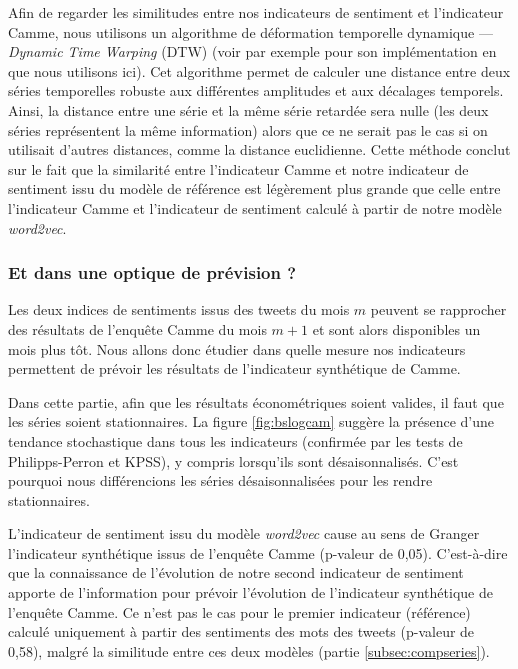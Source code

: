 \documentclass[11pt,french,french]{article}
\begin{document}
Afin de regarder les similitudes entre nos indicateurs de sentiment et l'indicateur Camme, nous utilisons un algorithme de déformation temporelle dynamique --- \emph{Dynamic Time Warping} (DTW) (voir par exemple \cite{dtw} pour son implémentation en \faRProject{} que nous utilisons ici).
Cet algorithme permet de calculer une distance entre deux séries temporelles robuste aux différentes amplitudes et aux décalages temporels.
Ainsi, la distance entre une série et la même série retardée sera nulle (les deux séries représentent la même information) alors que ce ne serait pas le cas si on utilisait d'autres distances, comme la distance euclidienne.
Cette méthode conclut sur le fait que la similarité entre l'indicateur Camme et notre indicateur de sentiment issu du modèle de référence est légèrement plus grande que celle entre l'indicateur Camme et l'indicateur de sentiment calculé à partir de notre modèle \emph{word2vec}.

\hypertarget{et-dans-une-optique-de-pruxe9vision}{%
\subsubsection{Et dans une optique de prévision ?}\label{et-dans-une-optique-de-pruxe9vision}}

Les deux indices de sentiments issus des tweets du mois \(m\) peuvent se rapprocher des résultats de l'enquête Camme du mois \(m+1\) et sont alors disponibles un mois plus tôt.
Nous allons donc étudier dans quelle mesure nos indicateurs permettent de prévoir les résultats de l'indicateur synthétique de Camme.

Dans cette partie, afin que les résultats économétriques soient valides, il faut que les séries soient stationnaires.
La figure \ref{fig:bslogcam} suggère la présence d'une tendance stochastique dans tous les indicateurs (confirmée par les tests de Philipps-Perron et KPSS), y compris lorsqu'ils sont désaisonnalisés.
C'est pourquoi nous différencions les séries désaisonnalisées pour les rendre stationnaires.

L'indicateur de sentiment issu du modèle \emph{word2vec} cause au sens de Granger l'indicateur synthétique issus de l'enquête Camme (p-valeur de 0,05).
C'est-à-dire que la connaissance de l'évolution de notre second indicateur de sentiment apporte de l'information pour prévoir l'évolution de l'indicateur synthétique de l'enquête Camme.
Ce n'est pas le cas pour le premier indicateur (référence) calculé uniquement à partir des sentiments des mots des tweets (p-valeur de 0,58), malgré la similitude entre ces deux modèles (partie \ref{subsec:compseries}).
\end{document}
